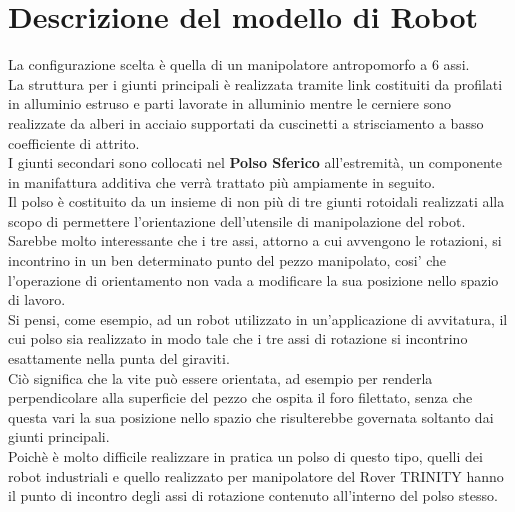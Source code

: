 \documentclass[%
corpo=11pt,
twoside,
 stile=classica,
oldstyle,
greek,%
]{toptesi}
\begin{document}
\section{Descrizione del modello di Robot}
La configurazione scelta è quella di un manipolatore antropomorfo a 6 assi. \\
La struttura per i giunti principali è realizzata tramite link costituiti da profilati in alluminio estruso e parti lavorate in alluminio mentre le cerniere sono realizzate da alberi in acciaio supportati da cuscinetti a strisciamento a basso coefficiente di attrito. \\
I giunti secondari sono collocati nel \textbf{Polso Sferico} all'estremità, un componente in manifattura additiva che verrà trattato più ampiamente in seguito. \\
Il polso è costituito da un insieme di non più di tre giunti rotoidali realizzati alla scopo di permettere l'orientazione dell'utensile di manipolazione del robot. \\
Sarebbe molto interessante che i tre assi, attorno a cui avvengono le rotazioni, si incontrino in un ben determinato punto del pezzo manipolato, cosi' che l'operazione di orientamento non vada a modificare la sua posizione nello spazio di lavoro. \\
Si pensi, come esempio, ad un robot utilizzato in un'applicazione di avvitatura, il cui polso sia realizzato in modo tale che i tre assi di rotazione si incontrino esattamente nella punta del giraviti.\\
 Ciò significa che la vite può essere orientata, ad esempio per renderla perpendicolare alla superficie del pezzo che ospita il foro filettato, senza che questa vari la sua posizione nello spazio che risulterebbe governata soltanto dai giunti principali. \\
 Poichè è molto difficile realizzare in pratica un polso di questo tipo, quelli dei robot industriali e quello realizzato per manipolatore del Rover TRINITY hanno il punto di incontro degli assi di rotazione contenuto all'interno del polso stesso.
\end{document}
